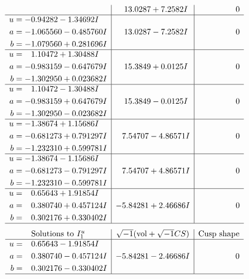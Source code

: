 \documentclass[1p]{elsarticle_modified}
\theoremstyle{definition}
\newcommand{\I}{\sqrt{-1}}
\begin{document}
$$\begin{array}{c|c|c}
 & \phantom{-}13.0287 + 7.2582 I & \phantom{-0.000000 } 0 \\ \hline\begin{aligned}
u &= -0.94282 - 1.34692 I \\
a &= -1.065560 - 0.485760 I \\
b &= -1.079560 + 0.281696 I\end{aligned}
 & \phantom{-}13.0287 - 7.2582 I & \phantom{-0.000000 } 0 \\ \hline\begin{aligned}
u &= \phantom{-}1.10472 + 1.30488 I \\
a &= -0.983159 - 0.647679 I \\
b &= -1.302950 + 0.023682 I\end{aligned}
 & \phantom{-}15.3849 + 0.0125 I & \phantom{-0.000000 } 0 \\ \hline\begin{aligned}
u &= \phantom{-}1.10472 - 1.30488 I \\
a &= -0.983159 + 0.647679 I \\
b &= -1.302950 - 0.023682 I\end{aligned}
 & \phantom{-}15.3849 - 0.0125 I & \phantom{-0.000000 } 0 \\ \hline\begin{aligned}
u &= -1.38674 + 1.15686 I \\
a &= -0.681273 + 0.791297 I \\
b &= -1.232310 + 0.599781 I\end{aligned}
 & \phantom{-}7.54707 - 4.86571 I & \phantom{-0.000000 } 0 \\ \hline\begin{aligned}
u &= -1.38674 - 1.15686 I \\
a &= -0.681273 - 0.791297 I \\
b &= -1.232310 - 0.599781 I\end{aligned}
 & \phantom{-}7.54707 + 4.86571 I & \phantom{-0.000000 } 0 \\ \hline\begin{aligned}
u &= \phantom{-}0.65643 + 1.91854 I \\
a &= \phantom{-}0.380740 + 0.457124 I \\
b &= \phantom{-}0.302176 + 0.330402 I\end{aligned}
 & -5.84281 + 2.46686 I & \phantom{-0.000000 } 0\\
 \hline 
 \end{array}$$\newpage$$\begin{array}{c|c|c}  
\text{Solutions to }I^u_{1}& \I (\text{vol} + \sqrt{-1}CS) & \text{Cusp shape}\\
 \hline 
\begin{aligned}
u &= \phantom{-}0.65643 - 1.91854 I \\
a &= \phantom{-}0.380740 - 0.457124 I \\
b &= \phantom{-}0.302176 - 0.330402 I\end{aligned}
 & -5.84281 - 2.46686 I & \phantom{-0.000000 } 0\\
 \hline 
 \end{array}$$\newpage\newpage\renewcommand{\arraystretch}{1}
\end{document}
